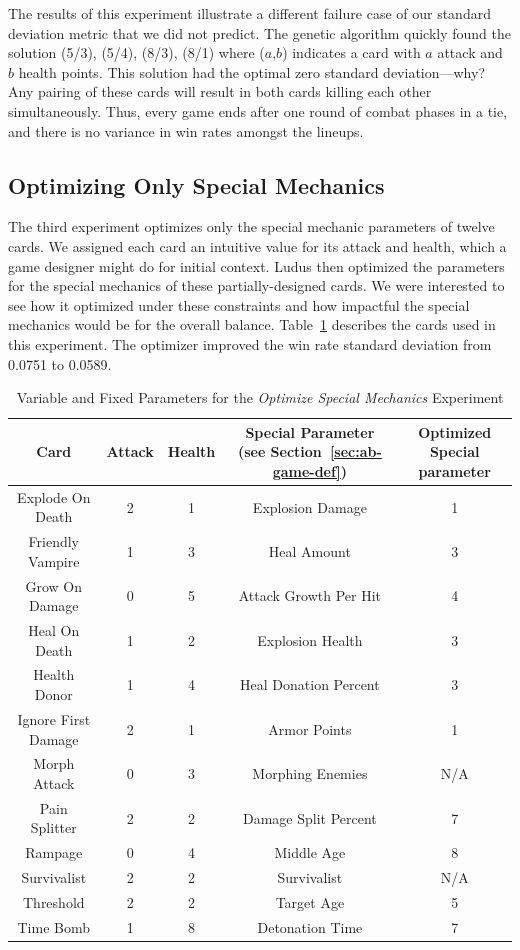 \documentclass[letterpaper]{article} %
\begin{document}
The results of this experiment illustrate a different failure case of our standard deviation metric that we did not predict. The genetic algorithm quickly found the solution (5/3), (5/4), (8/3), (8/1) where ($a$,$b$) indicates a card with $a$ attack and $b$ health points. This solution had the optimal zero standard deviation---why? Any pairing of these cards will result in both cards killing each other simultaneously. Thus, every game ends after one round of combat phases in a tie, and there is no variance in win rates amongst the lineups. 

 \subsection{Optimizing Only Special Mechanics}

The third experiment optimizes only the special mechanic parameters of twelve cards. We assigned each card an intuitive value for its attack and health, which a game designer might do for initial context. {\sc Ludus} then optimized the parameters for the special mechanics of these partially-designed cards. We were interested to see how it %
optimized under these constraints and how impactful the special mechanics would be for the overall balance. %
Table~\ref{tab:special_cards} describes the cards used in this experiment. The optimizer improved the win rate standard deviation from 0.0751 to 0.0589. 

\begin{table}[t]
\centering
\caption{Variable and Fixed Parameters for the \textit{Optimize Special Mechanics} Experiment}
\label{tab:special_cards}
\begin{tabular}{||c c c c c||} 
 \hline
 Card & Attack & Health & Special Parameter (see Section~\ref{sec:ab-game-def}) &  Optimized Special parameter\\ [0.5ex] 
 \hline\hline
 Explode On Death & 2 & 1 & Explosion Damage & 1\\ 
 \hline
 Friendly Vampire & 1 & 3 & Heal Amount & 3 \\
 \hline
 Grow On Damage & 0 & 5 & Attack Growth Per Hit & 4 \\
 \hline
 Heal On Death & 1 & 2 & Explosion Health & 3 \\
 \hline
 Health Donor & 1 & 4 & Heal Donation Percent & 3 \\
 \hline
 Ignore First Damage & 2 & 1 & Armor Points & 1 \\
 \hline
 Morph Attack & 0 & 3 & Morphing Enemies & N/A \\
 \hline
 Pain Splitter & 2 & 2 & Damage Split Percent & 7 \\
 \hline
 Rampage & 0 & 4 & Middle Age & 8 \\
 \hline
 Survivalist & 2 & 2 & Survivalist & N/A \\
 \hline
 Threshold & 2 & 2 & Target Age & 5 \\
 \hline
 Time Bomb & 1 & 8 & Detonation Time & 7 \\ 
 \hline
\end{tabular}
\end{table}
\end{document}
